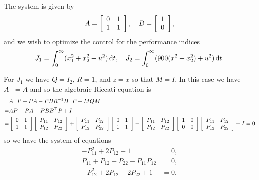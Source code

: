 \documentclass{article}
\begin{document}
The system is given by
$$
A =
\left[\begin{array}{c c}
  0 & 1 \\
  1 & 1
\end{array}\right], \quad
B =
\left[\begin{array}{c c}
  1 \\
  0
\end{array}\right],
$$
and we wish to optimize the control for the performance indices
$$
J_1 = \int_0^\infty (x_1^2 + x_2^2 + u^2) \dif t, \quad
J_2 = \int_0^\infty (900(x_1^2 + x_2^2) + u^2) \dif t.
$$

For $J_1$ we have $Q = I_2$, $R = 1$, and $z = x$ so that
$M = I$. In this case we have $A^{\top} = A$ and so
the algebraic Riccati equation is
\begin{align*}
   & A^\top P + P A - P B R^{-1} B^\top P + M Q M \\
 = & A P + P A - P B B^\top P + I \\
 = &
\left[\begin{array}{c c}
0 & 1 \\
1 & 1
\end{array}\right]
\left[\begin{array}{c c}
P_{11} & P_{12} \\
P_{12} & P_{22}
\end{array}\right]
+
\left[\begin{array}{c c}
P_{11} & P_{12} \\
P_{12} & P_{22}
\end{array}\right]
\left[\begin{array}{c c}
0 & 1 \\
1 & 1
\end{array}\right]
-
\left[\begin{array}{c c}
P_{11} & P_{12} \\
P_{12} & P_{22}
\end{array}\right]
\left[\begin{array}{c c}
1 & 0 \\
0 & 0
\end{array}\right]
\left[\begin{array}{c c}
P_{11} & P_{12} \\
P_{12} & P_{22}
\end{array}\right]
+
I = 0
\end{align*}
so we have the system of equations
\begin{align*}
  - P_{11}^2 + 2 P_{12} + 1 &= 0, \\
    P_{11}   +   P_{12} + P_{22} - P_{11} P_{12} &= 0, \\
  - P_{12}^2 + 2 P_{12} + 2 P_{22} + 1 &= 0.
\end{align*}
\end{document}

